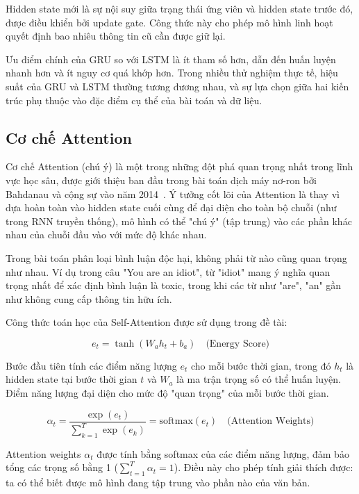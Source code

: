 \documentclass[../BTL.tex]{subfiles}
\begin{document}
Hidden state mới là sự nội suy giữa trạng thái ứng viên và hidden state trước đó, được điều khiển bởi update gate. Công thức này cho phép mô hình linh hoạt quyết định bao nhiêu thông tin cũ cần được giữ lại.

Ưu điểm chính của GRU so với LSTM là ít tham số hơn, dẫn đến huấn luyện nhanh hơn và ít nguy cơ quá khớp hơn. Trong nhiều thử nghiệm thực tế, hiệu suất của GRU và LSTM thường tương đương nhau, và sự lựa chọn giữa hai kiến trúc phụ thuộc vào đặc điểm cụ thể của bài toán và dữ liệu.

\subsection{Cơ chế Attention}
Cơ chế Attention (chú ý) là một trong những đột phá quan trọng nhất trong lĩnh vực học sâu, được giới thiệu ban đầu trong bài toán dịch máy nơ-ron bởi Bahdanau và cộng sự vào năm 2014~\cite{bahdanau2014attention}. Ý tưởng cốt lõi của Attention là thay vì dựa hoàn toàn vào hidden state cuối cùng để đại diện cho toàn bộ chuỗi (như trong RNN truyền thống), mô hình có thể "chú ý" (tập trung) vào các phần khác nhau của chuỗi đầu vào với mức độ khác nhau.

Trong bài toán phân loại bình luận độc hại, không phải từ nào cũng quan trọng như nhau. Ví dụ trong câu "You are an idiot", từ "idiot" mang ý nghĩa quan trọng nhất để xác định bình luận là toxic, trong khi các từ như "are", "an" gần như không cung cấp thông tin hữu ích.

Công thức toán học của Self-Attention được sử dụng trong đề tài:

\begin{equation}
    e_t = \tanh(W_a h_t + b_a) \quad \text{(Energy Score)}
\end{equation}

Bước đầu tiên tính các điểm năng lượng $e_t$ cho mỗi bước thời gian, trong đó $h_t$ là hidden state tại bước thời gian $t$ và $W_a$ là ma trận trọng số có thể huấn luyện. Điểm năng lượng đại diện cho mức độ "quan trọng" của mỗi bước thời gian.

\begin{equation}
    \alpha_t = \frac{\exp(e_t)}{\sum_{k=1}^{T} \exp(e_k)} = \text{softmax}(e_t) \quad \text{(Attention Weights)}
\end{equation}

Attention weights $\alpha_t$ được tính bằng softmax của các điểm năng lượng, đảm bảo tổng các trọng số bằng 1 ($\sum_{t=1}^{T} \alpha_t = 1$). Điều này cho phép tính giải thích được: ta có thể biết được mô hình đang tập trung vào phần nào của văn bản.
\end{document}
